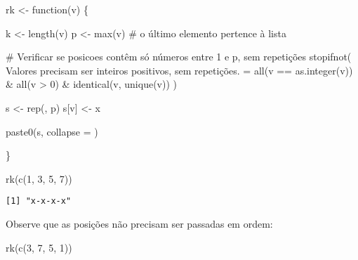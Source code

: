 \documentclass[
  letterpaper,
  DIV=11,
  numbers=noendperiod]{scrreprt}
\newenvironment{Shaded}{\begin{snugshade}}{\end{snugshade}}
\newcommand{\AttributeTok}[1]{\textcolor[rgb]{0.40,0.45,0.13}{#1}}
\newcommand{\CommentTok}[1]{\textcolor[rgb]{0.37,0.37,0.37}{#1}}
\newcommand{\ControlFlowTok}[1]{\textcolor[rgb]{0.00,0.23,0.31}{#1}}
\newcommand{\DecValTok}[1]{\textcolor[rgb]{0.68,0.00,0.00}{#1}}
\newcommand{\FunctionTok}[1]{\textcolor[rgb]{0.28,0.35,0.67}{#1}}
\newcommand{\NormalTok}[1]{\textcolor[rgb]{0.00,0.23,0.31}{#1}}
\newcommand{\OtherTok}[1]{\textcolor[rgb]{0.00,0.23,0.31}{#1}}
\newcommand{\SpecialCharTok}[1]{\textcolor[rgb]{0.37,0.37,0.37}{#1}}
\newcommand{\StringTok}[1]{\textcolor[rgb]{0.13,0.47,0.30}{#1}}
\begin{document}
\begin{Shaded}
\begin{Highlighting}[]
\NormalTok{rk }\OtherTok{\textless{}{-}} \ControlFlowTok{function}\NormalTok{(v) \{}
  
\NormalTok{  k }\OtherTok{\textless{}{-}} \FunctionTok{length}\NormalTok{(v)}
\NormalTok{  p }\OtherTok{\textless{}{-}} \FunctionTok{max}\NormalTok{(v)   }\CommentTok{\# o último elemento pertence à lista}
  
  \CommentTok{\# Verificar se posicoes contêm só números entre 1 e p, sem repetições}
  \FunctionTok{stopifnot}\NormalTok{(}
    \StringTok{\textquotesingle{}Valores precisam ser inteiros positivos, sem repetições.\textquotesingle{}} \OtherTok{=}
    \FunctionTok{all}\NormalTok{(v }\SpecialCharTok{==} \FunctionTok{as.integer}\NormalTok{(v)) }\SpecialCharTok{\&} 
      \FunctionTok{all}\NormalTok{(v }\SpecialCharTok{\textgreater{}} \DecValTok{0}\NormalTok{) }\SpecialCharTok{\&}
      \FunctionTok{identical}\NormalTok{(v, }\FunctionTok{unique}\NormalTok{(v))}
\NormalTok{  )}

\NormalTok{  s }\OtherTok{\textless{}{-}} \FunctionTok{rep}\NormalTok{(}\StringTok{\textquotesingle{}{-}\textquotesingle{}}\NormalTok{, p)}
\NormalTok{  s[v] }\OtherTok{\textless{}{-}} \StringTok{\textquotesingle{}x\textquotesingle{}}
  
  \FunctionTok{paste0}\NormalTok{(s, }\AttributeTok{collapse =} \StringTok{\textquotesingle{}\textquotesingle{}}\NormalTok{)}
  
\NormalTok{\}}
\end{Highlighting}
\end{Shaded}

\begin{Shaded}
\begin{Highlighting}[]
\FunctionTok{rk}\NormalTok{(}\FunctionTok{c}\NormalTok{(}\DecValTok{1}\NormalTok{, }\DecValTok{3}\NormalTok{, }\DecValTok{5}\NormalTok{, }\DecValTok{7}\NormalTok{))}
\end{Highlighting}
\end{Shaded}

\begin{verbatim}
[1] "x-x-x-x"
\end{verbatim}

Observe que as posições não precisam ser passadas em ordem:

\begin{Shaded}
\begin{Highlighting}[]
\FunctionTok{rk}\NormalTok{(}\FunctionTok{c}\NormalTok{(}\DecValTok{3}\NormalTok{, }\DecValTok{7}\NormalTok{, }\DecValTok{5}\NormalTok{, }\DecValTok{1}\NormalTok{))}
\end{Highlighting}
\end{Shaded}
\end{document}
